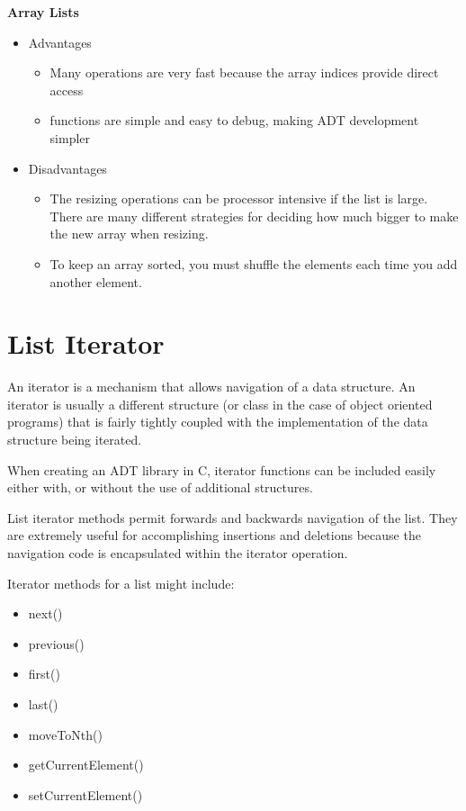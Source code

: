 \textbf{Array Lists}
\begin{itemize}
\item Advantages
\begin{itemize}
\item Many operations are very fast because the array indices provide direct access
\item functions are simple and easy to debug, making ADT development simpler  
\end{itemize}
\item Disadvantages
\begin{itemize}
\item The resizing operations can be processor intensive if the list is large. There are many different strategies for deciding how much bigger to make the new array when resizing.    
\item To keep an array sorted, you must shuffle the elements each time you add another element.    
\end{itemize}
\end{itemize}

\section{List Iterator}

An iterator is a mechanism that allows navigation of a data structure.   An iterator is usually a different structure (or class in the case of object oriented programs)  that is fairly tightly coupled with the implementation of the data structure being iterated.

When creating an ADT library in C,  iterator functions can be included easily either with, or without the use of additional structures.

List iterator methods permit forwards and backwards navigation of the 
       list. They are extremely useful for accomplishing insertions and 
       deletions because the navigation code is encapsulated within the 
       iterator operation.

Iterator methods for a list might include:
\begin{itemize}
	\item next()
	\item previous()
	\item first()
	\item last()
	\item moveToNth()
	\item getCurrentElement()
	\item setCurrentElement()
\end{itemize}

